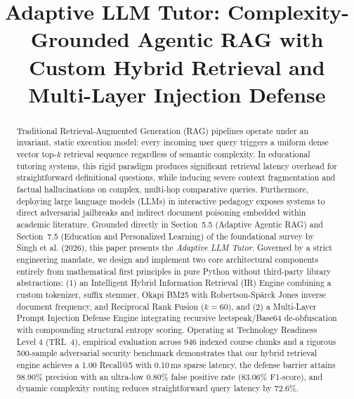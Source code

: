 \documentclass[conference]{IEEEtran}
\begin{document}
\title{Adaptive LLM Tutor: Complexity-Grounded Agentic RAG with Custom Hybrid Retrieval and Multi-Layer Injection Defense}

\author{
}

\maketitle

\begin{abstract}
Traditional Retrieval-Augmented Generation (RAG) pipelines operate under an invariant, static execution model: every incoming user query triggers a uniform dense vector top-$k$ retrieval sequence regardless of semantic complexity. In educational tutoring systems, this rigid paradigm produces significant retrieval latency overhead for straightforward definitional questions, while inducing severe context fragmentation and factual hallucinations on complex, multi-hop comparative queries. Furthermore, deploying large language models (LLMs) in interactive pedagogy exposes systems to direct adversarial jailbreaks and indirect document poisoning embedded within academic literature. Grounded directly in Section~5.5 (Adaptive Agentic RAG) and Section~7.5 (Education and Personalized Learning) of the foundational survey by Singh et al. (2026), this paper presents the \textit{Adaptive LLM Tutor}. Governed by a strict engineering mandate, we design and implement two core architectural components entirely from mathematical first principles in pure Python without third-party library abstractions: (1) an Intelligent Hybrid Information Retrieval (IR) Engine combining a custom tokenizer, suffix stemmer, Okapi BM25 with Robertson-Sp\"arck Jones inverse document frequency, and Reciprocal Rank Fusion ($k=60$), and (2) a Multi-Layer Prompt Injection Defense Engine integrating recursive leetspeak/Base64 de-obfuscation with compounding structural entropy scoring. Operating at Technology Readiness Level 4 (TRL~4), empirical evaluation across 946 indexed course chunks and a rigorous 500-sample adversarial security benchmark demonstrates that our hybrid retrieval engine achieves a 1.00 Recall@5 with 0.10\,ms sparse latency, the defense barrier attains 98.90\% precision with an ultra-low 0.80\% false positive rate (83.06\% F1-score), and dynamic complexity routing reduces straightforward query latency by 72.6\%.
\end{abstract}
\end{document}
